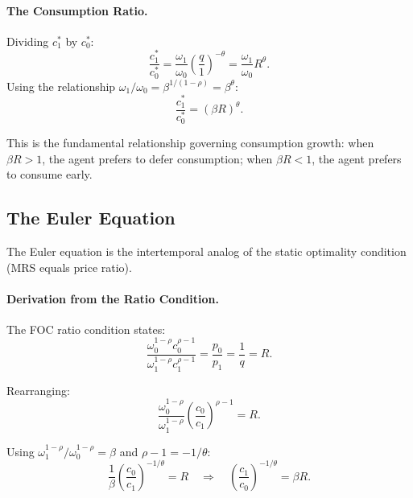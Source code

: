\paragraph{The Consumption Ratio.}
Dividing $c_1^*$ by $c_0^*$:
\begin{equation}
\frac{c_1^*}{c_0^*} = \frac{\omega_1}{\omega_0} \left( \frac{q}{1} \right)^{-\theta} = \frac{\omega_1}{\omega_0} R^{\theta}.
\label{eq:consumption-ratio}
\end{equation}
Using the relationship $\omega_1 / \omega_0 = \beta^{1/(1-\rho)} = \beta^{\theta}$:
\begin{equation}
\frac{c_1^*}{c_0^*} = (\beta R)^{\theta}.
\label{eq:consumption-ratio-final}
\end{equation}

This is the fundamental relationship governing consumption growth: when $\beta R > 1$, the agent prefers to defer consumption; when $\beta R < 1$, the agent prefers to consume early.

\subsection{The Euler Equation}
\label{subsec:euler}

The Euler equation is the intertemporal analog of the static optimality condition (MRS equals price ratio).

\paragraph{Derivation from the Ratio Condition.}
The FOC ratio condition states:
\begin{equation}
\frac{\omega_0^{1-\rho} c_0^{\rho-1}}{\omega_1^{1-\rho} c_1^{\rho-1}} = \frac{p_0}{p_1} = \frac{1}{q} = R.
\label{eq:ratio-intertemporal}
\end{equation}

Rearranging:
\begin{equation}
\frac{\omega_0^{1-\rho}}{\omega_1^{1-\rho}} \left( \frac{c_0}{c_1} \right)^{\rho - 1} = R.
\label{eq:ratio-rearranged}
\end{equation}

Using $\omega_1^{1-\rho} / \omega_0^{1-\rho} = \beta$ and $\rho - 1 = -1/\theta$:
\begin{equation}
\frac{1}{\beta} \left( \frac{c_0}{c_1} \right)^{-1/\theta} = R \quad \Longrightarrow \quad \left( \frac{c_1}{c_0} \right)^{-1/\theta} = \beta R.
\label{eq:euler-derivation}
\end{equation}

